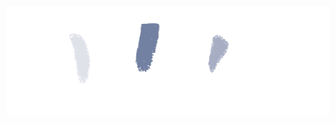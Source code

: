 \documentclass[german,aspectratio=169,notoc,titlestyle=tud,draft]{tudbeamer}%
\begin{document}
\begin{finalframe}
	\vspace*{2ex}\centering\includegraphics[keepaspectratio=true,width=0.8\textwidth]{br_logo_weiss.png}
\end{finalframe}

% 	

	    


		    
\end{document}
